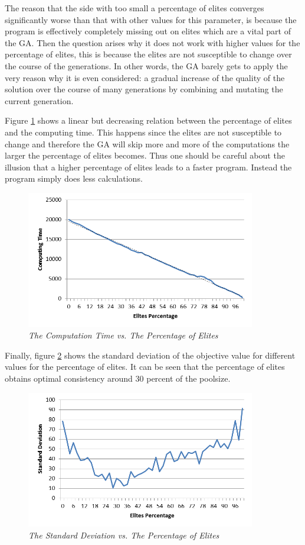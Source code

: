 \noindent 
The reason that the side with too small a percentage of elites converges significantly worse than that with other values for this parameter, is because the program is effectively completely missing out on elites which are a vital part of the GA. Then the question arises why it does not work with higher values for the percentage of elites, this is because the elites are not susceptible to change over the course of the generations. In other words, the GA barely gets to apply the very reason why it is even considered: a gradual increase of the quality of the solution over the course of many generations by combining and mutating the current generation.
\par
Figure \ref{CTEP} shows a linear but decreasing relation between the percentage of elites and the computing time. This happens since the elites are not susceptible to change and therefore the GA will skip more and more of the computations the larger the percentage of elites becomes. Thus one should be careful about the illusion that a higher percentage of elites leads to a faster program. Instead the program simply does less calculations.

\begin{figure}[H] 
	\centering
	\includegraphics[height=6cm]{CTEP}
	\caption{\textsl{The Computation Time vs. The Percentage of Elites}}
	\label{CTEP}
\end{figure}

Finally, figure \ref{SDEP} shows the standard deviation of the objective value for different values for the percentage of elites. It can be seen that the percentage of elites obtains optimal consistency around 30 percent of the poolsize.

\begin{figure}[H] 
	\centering
	\includegraphics[height=6cm]{SDEP}
	\caption{\textsl{The Standard Deviation vs. The Percentage of Elites}}
	\label{SDEP}
\end{figure}

